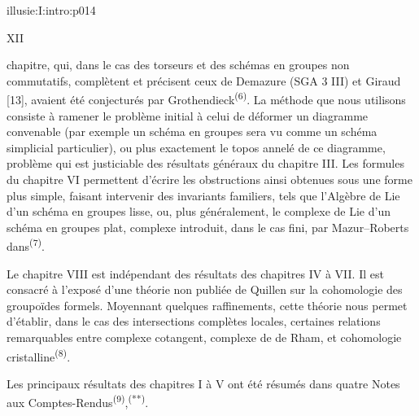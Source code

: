 \IllusieSetPhysicalPageSize{447bp}{698.6bp}
\begin{illusiefrontpage}{illusie:I:intro:p014}{}
\begin{center}\fontsize{10}{12}\selectfont XII\end{center}
\vspace{12bp}
\hypertarget{illusie:I:intro:p014:p1}{}%
chapitre, qui, dans le cas des torseurs et des schémas en groupes non commutatifs,
complètent et précisent ceux de Demazure (SGA 3 III) et Giraud [13], avaient été
conjecturés par Grothendieck\textsuperscript{(6)}. La méthode que nous utilisons
consiste à ramener le problème initial à celui de déformer un diagramme convenable
(par exemple un schéma en groupes sera vu comme un schéma simplicial particulier),
ou plus exactement le topos annelé de ce diagramme, problème qui est justiciable
des résultats généraux du chapitre III. Les formules du chapitre VI permettent
d'écrire les obstructions ainsi obtenues sous une forme plus simple, faisant
intervenir des invariants familiers, tels que l'Algèbre de Lie d'un schéma en
groupes lisse, ou, plus généralement, le complexe de Lie d'un schéma en groupes
plat, complexe introduit, dans le cas fini, par Mazur--Roberts
dans\textsuperscript{(7)}.

\vspace{4bp}
\hypertarget{illusie:I:intro:p014:p2}{}%
Le chapitre VIII est indépendant des résultats des chapitres IV à VII. Il est
consacré à l'exposé d'une théorie non publiée de Quillen sur la cohomologie des
groupoïdes formels. Moyennant quelques raffinements, cette théorie nous permet
d'établir, dans le cas des intersections complètes locales, certaines relations
remarquables entre complexe cotangent, complexe de de Rham, et cohomologie
cristalline\textsuperscript{(8)}.

\vspace{4bp}
\hypertarget{illusie:I:intro:p014:p3}{}%
Les principaux résultats des chapitres I à V ont été résumés dans quatre Notes aux
Comptes-Rendus\textsuperscript{(9)},\textsuperscript{(**)}.

\IllusieNoteRule
{}\hypertarget{illusie:I:intro:p014:n6}{}%
\hypertarget{illusie:I:intro:p014:n7}{}%
\hypertarget{illusie:I:intro:p014:n8}{}%
\hypertarget{illusie:I:intro:p014:n9}{}%
\hypertarget{illusie:I:intro:p014:nss}{}%
\end{illusiefrontpage}

